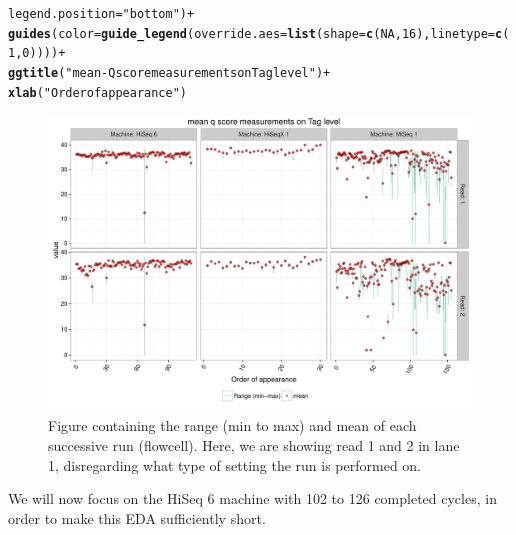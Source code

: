 \documentclass[a4paper,11pt,fleqn,twoside,notitlepage]{report}
\makeatletter
\def\maxwidth{ %
  \ifdim\Gin@nat@width>\linewidth
    \linewidth
  \else
    \Gin@nat@width
  \fi
}
\newcommand{\hlnum}[1]{\textcolor[rgb]{0.686,0.059,0.569}{#1}}%
\newcommand{\hlstr}[1]{\textcolor[rgb]{0.192,0.494,0.8}{#1}}%
\newcommand{\hlopt}[1]{\textcolor[rgb]{0,0,0}{#1}}%
\newcommand{\hlstd}[1]{\textcolor[rgb]{0.345,0.345,0.345}{#1}}%
\newcommand{\hlkwc}[1]{\textcolor[rgb]{0.333,0.667,0.333}{#1}}%
\newcommand{\hlkwd}[1]{\textcolor[rgb]{0.737,0.353,0.396}{\textbf{#1}}}%
\newenvironment{kframe}{%
 \def\at@end@of@kframe{}%
 \ifinner\ifhmode%
  \def\at@end@of@kframe{\end{minipage}}%
  \begin{minipage}{\columnwidth}%
 \fi\fi%
 \def\FrameCommand##1{\hskip\@totalleftmargin \hskip-\fboxsep
 \colorbox{shadecolor}{##1}\hskip-\fboxsep
     \hskip-\linewidth \hskip-\@totalleftmargin \hskip\columnwidth}%
 \MakeFramed {\advance\hsize-\width
   \@totalleftmargin\z@ \linewidth\hsize
   \@setminipage}}%
 {\par\unskip\endMakeFramed%
 \at@end@of@kframe}
\newenvironment{knitrout}{}{} %
\makeatother
\begin{document}
\begin{knitrout}
\begin{kframe}
\begin{alltt}
        \hlkwc{legend.position}\hlstd{=}\hlstr{"bottom"}\hlstd{)} \hlopt{+}
  \hlkwd{guides}\hlstd{(}\hlkwc{color}\hlstd{=}\hlkwd{guide_legend}\hlstd{(}\hlkwc{override.aes}\hlstd{=}\hlkwd{list}\hlstd{(}\hlkwc{shape}\hlstd{=}\hlkwd{c}\hlstd{(}\hlnum{NA}\hlstd{,}\hlnum{16}\hlstd{),}\hlkwc{linetype}\hlstd{=}\hlkwd{c}\hlstd{(}\hlnum{1}\hlstd{,}\hlnum{0}\hlstd{))))}\hlopt{+}
  \hlkwd{ggtitle}\hlstd{(}\hlstr{"mean-Q score measurements on Tag level"}\hlstd{)} \hlopt{+}
  \hlkwd{xlab}\hlstd{(}\hlstr{"Order of appearance"}\hlstd{)}
\end{alltt}
\end{kframe}\begin{figure}[!htb]
\includegraphics[width=\maxwidth]{figure/TagLevelTS-1} \caption[Figure containing the range (min to max) and mean of each successive run (flowcell)]{Figure containing the range (min to max) and mean of each successive run (flowcell). Here, we are showing read 1 and 2 in lane 1, disregarding what type of setting the run is performed on.}\label{fig:TagLevelTS}
\end{figure}


\end{knitrout}
We will now focus on the HiSeq 6 machine with 102 to 126 completed cycles, in order to make this EDA sufficiently short. 
\end{document}
